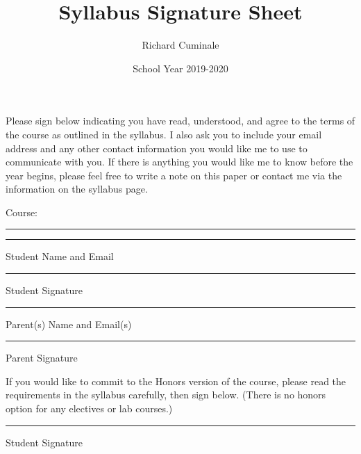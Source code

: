 \documentclass{article}
\title{Syllabus Signature Sheet}
\author{Richard Cuminale}
\date{School Year 2019-2020}
\begin{document}
\maketitle

Please sign below indicating you have read, understood, and agree to
the terms of the course as outlined in the syllabus. I also ask you to
include your email address and any other contact information you would
like me to use to communicate with you. If there is anything you would
like me to know before the year begins, please feel free to write a
note on this paper or contact me via the information on the syllabus
page.

\vspace{1.0cm}
Course: 
\rule{3.0cm}{1.0pt}

\vspace{3.0em}
\rule{10.0cm}{1.0pt}

Student Name and Email

\vspace{3.0em}
\rule{6.0cm}{1.0pt}

Student Signature

\vspace{3.0em}
\rule{10.0cm}{1.0pt}

Parent(s) Name and Email(s)

\vspace{3.0em}
\rule{6.0cm}{1.0pt}

Parent Signature

\vfill

If you would like to commit to the Honors version of the course,
please read the requirements in the syllabus carefully, then sign below. 
(There is no honors option for any electives or lab
courses.)

\vspace{3.0em}
\rule{6.0cm}{1.0pt}

Student Signature
\end{document}
